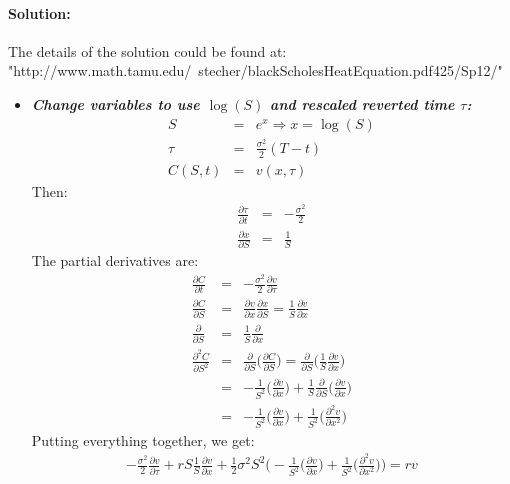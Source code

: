 \paragraph{Solution:}
The details of the solution could be found at:\\
"http://www.math.tamu.edu/~stecher/blackScholesHeatEquation.pdf425/Sp12/"
\begin{itemize}
	\item \textbf{\textit{Change variables to use $\log(S)$ and rescaled reverted time $\tau $:}}
	\begin{eqnarray}
		S &=& e^{x} \Rightarrow x = \log(S)\\
		\tau &=& \frac{\sigma^{2}}{2}(T - t)\\
		C(S, t) &=& v(x, \tau)
	\end{eqnarray}
	Then:
	\begin{eqnarray}
	\frac{\partial\tau}{\partial t} &=& -\frac{\sigma^{2}}{2}\\	
	\frac{\partial x}{\partial S} &=& \frac{1}{S}
	\end{eqnarray}
	The partial derivatives are:
	\begin{eqnarray}
		\frac{\partial C}{\partial t} &=& -\frac{\sigma^{2}}{2}\frac{\partial v}{\partial\tau}\\
		\frac{\partial C}{\partial S} &=& \frac{\partial v}{\partial x}\frac{\partial x}{\partial S} = \frac{1}{S}\frac{\partial v}{\partial x}\\
		\frac{\partial}{\partial S} &=& \frac{1}{S}\frac{\partial}{\partial x}\\
		\nonumber
		\frac{\partial ^{2}C}{\partial S^{2}} &=& \frac{\partial}{\partial S}\bigg(\frac{\partial C}{\partial S}\bigg) = \frac{\partial}{\partial S}\bigg(\frac{1}{S}\frac{\partial v}{\partial x}\bigg)\\
		\nonumber
		&=& -\frac{1}{S^{2}}\bigg(\frac{\partial v}{\partial x}\bigg) + \frac{1}{S}\frac{\partial }{\partial S}\bigg(\frac{\partial v}{\partial x}\bigg)\\
		&=& -\frac{1}{S^{2}}\bigg(\frac{\partial v}{\partial x}\bigg) + \frac{1}{S^{2}}\bigg(\frac{\partial^{2} v}{\partial x^{2}}\bigg)
	\end{eqnarray}
	Putting everything together, we get:
	\begin{eqnarray}
		-\frac{\sigma^{2}}{2}\frac{\partial v}{\partial \tau} + rS\frac{1}{S}\frac{\partial v}{\partial x}  + \frac{1}{2}\sigma^{2}S^{2}\bigg(-\frac{1}{S^{2}}\bigg(\frac{\partial v}{\partial x}\bigg) + \frac{1}{S^{2}}\bigg(\frac{\partial^{2} v}{\partial x^{2}}\bigg)\bigg) = rv

\end{eqnarray}
\end{itemize}
